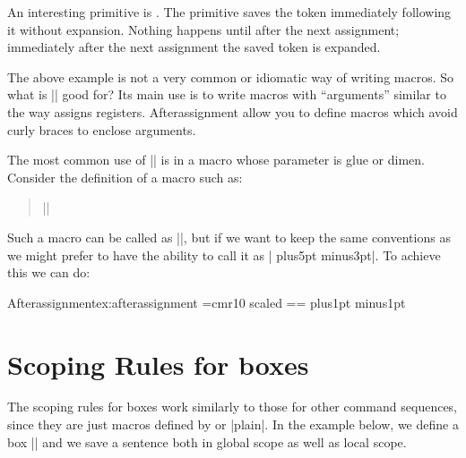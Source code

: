 An interesting primitive is . The primitive saves the token immediately following it without
expansion. Nothing happens until after the next assignment; immediately after the next assignment the saved token is expanded.


The above example is not a very common or idiomatic way of writing macros. So what is |\afterassignment| good for? Its main use is to write macros with \enquote{arguments} similar to the way \tex assigns registers. Afterassignment allow you to define macros which avoid curly braces to enclose arguments.

The most common use of |\afterassignment| is in a macro whose parameter is glue or dimen. Consider the definition of a macro such as:
\begin{quote}
 |\def\myglue#1{\leftskip=#1 \rightskip=#1}|
\end{quote}

Such a macro can be called as ||, but if we want to keep the same conventions as \tex we might prefer to have the ability to call it as |\myglue 3pt plus5pt minus3pt|. To achieve this we can do:

\begin{texexample}{Afterassignment}{ex:afterassignment}
\bgroup
\font\larger=cmr10 scaled
\larger
\newskip\tempskip
\def\myglue{\afterassignment\myglueaux \tempskip}
\def\myglueaux{\leftskip=\tempskip \rightskip=\tempskip}
\myglue=30pt plus1pt minus1pt
\lorem\par
\egroup
\lorem
\end{texexample}



\section{Scoping Rules for boxes}

The scoping rules for boxes work similarly to those for other command sequences, since they are just macros defined by \latex or |plain|. In the example below, we define a box |\mybox| and we save a sentence both in global scope as well as local scope.

